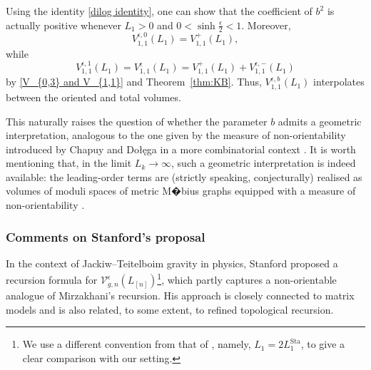 \documentclass[12pt]{amsart}
\theoremstyle{plain}
\theoremstyle{definition}
\theoremstyle{remark}
\numberwithin{equation}{section}
\begin{document}
Using the identity \eqref{dilog identity}, one can show that the coefficient of $b^2$ is actually positive whenever $L_1>0$ and $0<\sinh\frac{\epsilon}{2}<1$. 
Moreover,
$$
V_{1,1}^{\epsilon,0}(L_1)=V_{1,1}^{+}(L_1),
$$ 
while
$$
V_{1,1}^{\epsilon,1}(L_1)=V_{1,1}^{\epsilon}(L_1)=V_{1,1}^{+}(L_1)+V_{1,1}^{\epsilon,-}(L_1)
$$
by \eqref{V_{0,3} and V_{1,1}} and Theorem~\ref{thm:KB}. Thus, $V_{1,1}^{\epsilon,b}(L_1)$ interpolates between the oriented and total volumes.  

This naturally raises the question of whether the parameter $b$ admits a geometric interpretation, analogous to the one given by the measure of non-orientability introduced by Chapuy and Do\l\k{e}ga in a more combinatorial context \cite{CD20}. It is worth mentioning that, in the limit $L_k\to\infty$, such a geometric interpretation is indeed available: the leading-order terms are (strictly speaking, conjecturally) realised as volumes of moduli spaces of metric M�bius graphs equipped with a measure of non-orientability \cite{CGGO26}.


\subsubsection{Comments on Stanford's proposal}

In the context of Jackiw--Teitelboim gravity in physics, Stanford \cite{Sta23} proposed a recursion formula for $\mathcal{V}_{g,n}^{\epsilon}(L_{[n]})$\footnote{We use a different convention from that of \cite{Sta23}, namely, $L_1=2L_1^{\text{Sta}}$, to give a clear comparison with our setting.}, %
which partly captures a non-orientable analogue of Mirzakhani's recursion. His approach is closely connected to matrix models and is also related, to some extent, to refined topological recursion.








\end{document}
